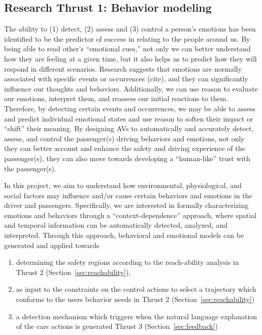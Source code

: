 \subsection{Research Thrust 1: Behavior modeling}
\label{sec:behaviour}

 The ability to (1) detect, (2) assess and (3) control a person’s emotions has been identified to be the predictor of success in relating to the people around us. By being able to read other’s “emotional cues,” not only we can better understand how they are feeling at a given time, but it also helps us to predict how they will respond in different scenarios. Research suggests that emotions are normally associated with specific events or occurrences  (cite), and they can significantly influence our thoughts and behaviors. Additionally, we can use reason to evaluate our emotions, interpret them, and reassess our initial reactions to them. Therefore, by detecting certain events and occurrences, we may be able to assess and predict individual emotional states and use reason to soften their impact or “shift” their meaning. By designing AVs to automatically and accurately detect, assess, and control the passenger(s) driving behaviors and emotions, not only they can better account and enhance the safety and driving experience of the passenger(s), they can also move towards developing a “human-like” trust with the passenger(s). 
 
 In this project, we aim to understand how environmental, physiological, and social factors may influence and/or cause certain behaviors and emotions in the driver and passengers. Specifically, we are interested in formally characterizing emotions and behaviors through a “context-dependence” approach, where spatial and temporal information can be automatically detected, analyzed, and interpreted. Through this approach, behavioral and emotional models can be generated and applied towards
 \begin{enumerate}
     \item determining the safety regions according to the reach-ability analysis in Thrust 2 (Section~\ref{sec:reachability}),
     \item as input to the constraints on the control actions to select a trajectory which conforms to the users behavior needs in Thrust 2 (Section~\ref{sec:reachability})
     \item a detection mechanism which triggers when the natural language explanation of the cars actions is generated Thrust 3 (Section~\ref{sec:feedback})
 \end{enumerate}
 

